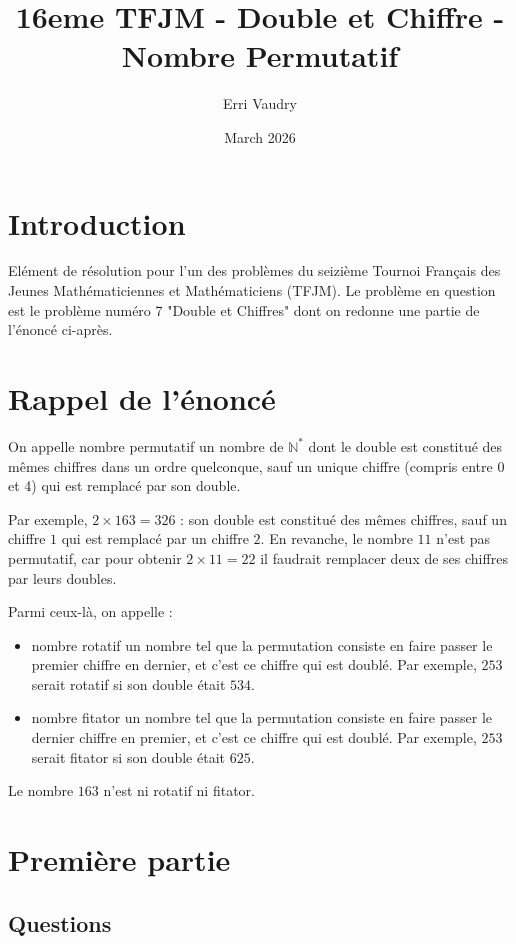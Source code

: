 \documentclass{article}
\title{16eme TFJM - Double et Chiffre - Nombre Permutatif}
\author{Erri Vaudry}
\date{March 2026}
\begin{document}
\maketitle

\section{Introduction}

Elément de résolution pour l'un des problèmes du seizième Tournoi Français des Jeunes Mathématiciennes et Mathématiciens (TFJM). Le problème en question est le problème numéro 7 "Double et Chiffres" dont on redonne une partie de l'énoncé ci-après.

\section{Rappel de l'énoncé}

On appelle nombre permutatif un nombre de $\mathbb{N}^*$ dont le double est constitué des mêmes
chiffres dans un ordre quelconque, sauf un unique chiffre (compris entre 0 et 4) qui est remplacé
par son double.

Par exemple, $2 × 163 = 326$ : son double est constitué des mêmes chiffres, sauf un chiffre $1$ qui
est remplacé par un chiffre $2$. En revanche, le nombre $11$ n’est pas permutatif, car pour obtenir
$2 × 11 = 22$ il faudrait remplacer deux de ses chiffres par leurs doubles.

Parmi ceux-là, on appelle :
\begin{itemize}
    \item nombre rotatif un nombre tel que la permutation consiste en faire passer le premier
chiffre en dernier, et c’est ce chiffre qui est doublé. Par exemple, $253$ serait rotatif si son
double était $534$.
    \item nombre fitator un nombre tel que la permutation consiste en faire passer le dernier
chiffre en premier, et c’est ce chiffre qui est doublé. Par exemple, $253$ serait fitator si son
double était $625$.
\end{itemize}

Le nombre $163$ n’est ni rotatif ni fitator.

\section{Première partie}

\subsection{Questions}
\end{document}
